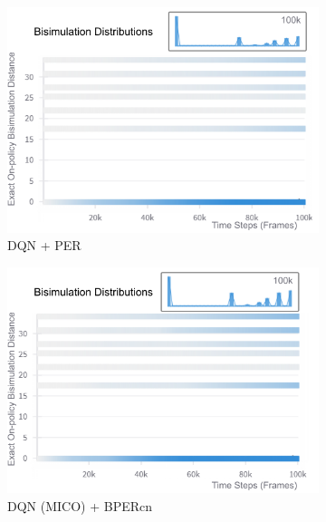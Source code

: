 \begin{figure}[h]
    \centering
    \begin{subfigure}{0.32\textwidth}
    \includegraphics[width=\linewidth]{Results/grid_world/exact_bisimulation_dqn_per.png}
        \caption{DQN + PER}
        \label{fig:exact_bisim_per}
    \end{subfigure}
    \hfill
    \begin{subfigure}{0.32\textwidth}
        \includegraphics[width=\linewidth]{Results/grid_world/exact_bisimulation_dqn_mico_bpercn.png}
        \caption{DQN (MICO) + BPERcn}
        \label{fig:exact_bisim_bpercn}
    \end{subfigure}
    \hfill
    \begin{subfigure}{0.32\textwidth}

\end{subfigure}
\end{figure}

